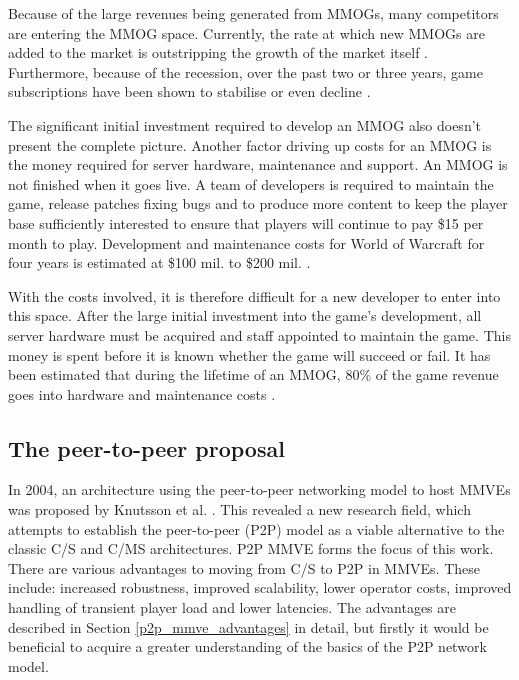 Because of the large revenues being generated from MMOGs, many competitors are entering the MMOG space. Currently, the rate at which new MMOGs are added to the market is outstripping the growth of the market itself \cite{newzoo_mmo_report}. Furthermore, because of the recession, over the past two or three years, game subscriptions have been shown to stabilise or even decline \cite{mmo_growth_chart}.

The significant initial investment required to develop an MMOG also doesn't present the complete picture. Another factor driving up costs for an MMOG is the money required for server hardware, maintenance and support. An MMOG is not finished when it goes live. A team of developers is required to maintain the game, release patches fixing bugs and to produce more content to keep the player base sufficiently interested to ensure that players will continue to pay \$15 per month to play. Development and maintenance costs for World of Warcraft for four years is estimated at \$100 mil. to \$200 mil. \cite{wow_cost}.

With the costs involved, it is therefore difficult for a new developer to enter into this space. After the large initial investment into the game's development, all server hardware must be acquired and staff appointed to maintain the game. This money is spent before it is known whether the game will succeed or fail. It has been estimated that during the lifetime of an MMOG, 80\% of the game revenue goes into hardware and maintenance costs \cite{cs_mmog_cost}.

\subsection{The peer-to-peer proposal}

In 2004, an architecture using the peer-to-peer networking model to host MMVEs was proposed by Knutsson et al. \cite{knutsson_p2p_first}. This
revealed a new research field, which attempts to establish the peer-to-peer (P2P) model as a viable alternative to the classic C/S and C/MS
architectures. P2P MMVE forms the focus of this work. There are various advantages to moving from C/S to P2P in MMVEs. These include: increased robustness, improved scalability, lower operator costs, improved handling of transient player load and lower latencies. The advantages are described in Section \ref{p2p_mmve_advantages} in detail,
but firstly it would be beneficial to acquire a greater understanding of the basics of the P2P network model.

